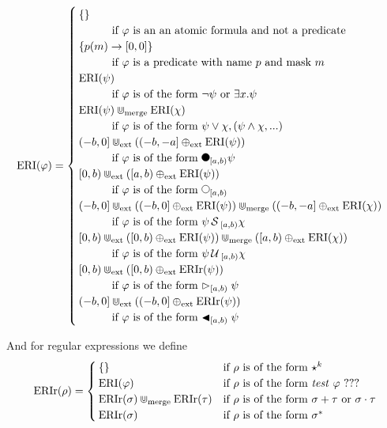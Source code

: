 \begin{equation*}
    \ERI(\varphi) =
    \begin{cases}
        \{\} \\
             \quad\quad\quad \text{if $\varphi$ is an an atomic formula and not a predicate} \\ 
        \{p(m) \rightarrow [0,0]\} \\
             \quad\quad\quad \text{if $\varphi$ is a predicate with name $p$ and mask $m$} \\
        \ERI(\psi) \\
            \quad\quad\quad \text{if $\varphi$ is of the form $\neg \psi$ or $\exists x.\psi$} \\
        \ERI(\psi) \Cupmerge \ERI(\chi) \\
            \quad\quad\quad \text{if $\varphi$ is of the form $\psi \lor \chi, (\psi \land \chi, ...)$} \\
        (-b,0] \Cupext ((-b,-a] \oplusext \ERI(\psi)) \\ 
            \quad\quad\quad \text{if $\varphi$ is of the form $\Previous_{[a,b)}\psi$} \\
        [0,b) \Cupext ([a,b) \oplusext \ERI(\psi)) \\
            \quad\quad\quad \text{if $\varphi$ is of the form $\Next_{[a,b)}$}\\
        (-b,0] \Cupext ((-b,0] \oplusext \ERI(\psi)) \Cupmerge ((-b,-a] \oplusext \ERI(\chi)) \\
            \quad\quad\quad \text{if $\varphi$ is of the form $\psi \Since_{[a,b)} \chi$} \\
        [0,b) \Cupext ([0,b) \oplusext \ERI(\psi)) \Cupmerge ([a,b) \oplusext \ERI(\chi)) \\
            \quad\quad\quad \text{if $\varphi$ is of the form $\psi \Until_{[a,b)} \chi$} \\
        [0,b) \Cupext ([0,b) \oplusext \ERIr(\psi)) \\
            \quad\quad\quad \text{if $\varphi$ is of the form $\Fregex_{[a,b)} \psi$ }\\
        (-b,0] \Cupext ((-b,0] \oplusext \ERIr(\psi)) \\
            \quad\quad\quad \text{if $\varphi$ is of the form $\Pregex_{[a,b)} \psi$ }\\
    \end{cases}
\end{equation*}

And for regular expressions we define 
\begin{equation*}
    \operatorname{ERIr}(\rho) =
    \begin{cases}
        \{\} & \text{if $\rho$ is of the form $\star^k$} \\
        \operatorname{ERI}(\varphi) & \text{if $\rho$ is of the form \textit{test} $\varphi$ ???} \\
        \operatorname{ERIr}(\sigma) \Cup_{\text{merge}} \operatorname{ERIr}(\tau) & \text{if $\rho$ is of the form $\sigma + \tau$ or $\sigma \cdot \tau$} \\
        \operatorname{ERIr}(\sigma) & \text{if $\rho$ is of the form $\sigma^*$}
    \end{cases}
\end{equation*}

\section{}


